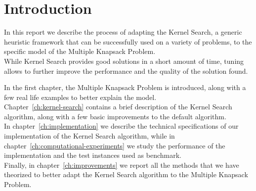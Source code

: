 \chapter{Introduction}

In this report we describe the process of adapting the Kernel Search,
a generic heuristic framework that can be successfully used on a variety of
problems, to the specific model of the Multiple Knapsack Problem.\\
While Kernel Search provides good solutions in a short amount of time,
tuning allows to further improve the performance and the quality of the solution found.

In the first chapter, the Multiple Knapsack Problem is introduced,
along with a few real life examples to better explain the model.\\
Chapter~\ref{ch:kernel-search} contains a brief description of the Kernel Search algorithm,
along with a few basic improvements to the default algorithm.\\
In chapter~\ref{ch:implementation} we describe the technical
specifications of our implementation of the Kernel Search algorithm,
while in chapter~\ref{ch:computational-experiments} we study
the performance of the implementation and the test instances used as benchmark.\\
Finally, in chapter~\ref{ch:improvements} we report all
the methods that we have theorized to better adapt the Kernel Search
algorithm to the Multiple Knapsack Problem.
